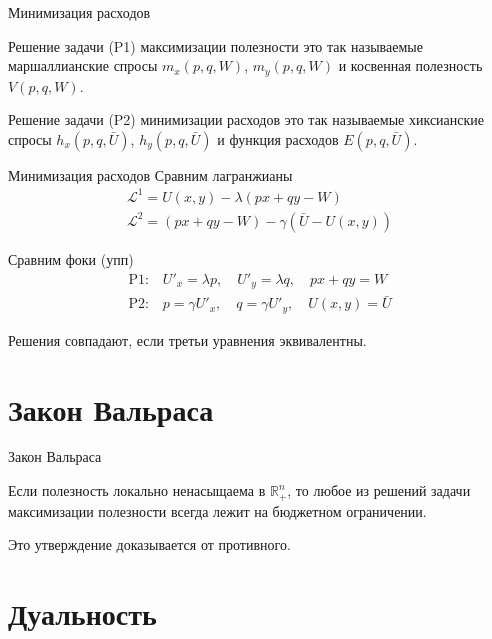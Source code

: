 \documentclass{beamer}
\begin{document}
\begin{frame}{Минимизация расходов}

Решение задачи (P1) максимизации полезности это так называемые маршаллианские спросы $m_x(p,q,W)$, $m_y(p,q,W)$ и косвенная полезность $V(p,q,W)$.

Решение задачи (P2) минимизации расходов это так называемые хиксианские спросы $h_x(p,q,\bar U)$, $h_y(p,q,\bar U)$ и функция расходов $E(p,q,\bar U)$.

\end{frame}

\begin{frame}{Минимизация расходов}
Сравним лагранжианы
\begin{gather*}
\mathcal{L}^{1} = U(x, y) - \lambda (px + qy - W)\\
\mathcal{L}^{2} = (px + qy - W) - \gamma (\bar U - U(x,y))
\end{gather*}

Сравним фоки (упп)
\begin{gather*}
\text{P1:} \quad U'_x = \lambda p, \quad U'_y = \lambda q, \quad px + qy = W\\
\text{P2:} \quad p = \gamma U'_x, \quad q = \gamma U'_y, \quad U(x,y) = \bar U
\end{gather*}

Решения совпадают, если третьи уравнения эквивалентны.

\end{frame}

\section{Закон Вальраса}

\begin{frame}{Закон Вальраса}

\begin{theorem}
Если полезность локально ненасыщаема в $\mathbb{R}^n_{+}$, то любое из решений задачи максимизации полезности всегда лежит на бюджетном ограничении.
\end{theorem}

Это утверждение доказывается от противного. 

\end{frame}

\section{Дуальность}
\end{document}

